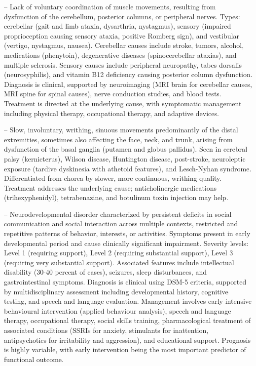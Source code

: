 -- Lack of voluntary coordination of muscle movements, resulting from dysfunction of the cerebellum, posterior columns, or peripheral nerves. Types: cerebellar (gait and limb ataxia, dysarthria, nystagmus), sensory (impaired proprioception causing sensory ataxia, positive Romberg sign), and vestibular (vertigo, nystagmus, nausea). Cerebellar causes include stroke, tumors, alcohol, medications (phenytoin), degenerative diseases (spinocerebellar ataxias), and multiple sclerosis. Sensory causes include peripheral neuropathy, tabes dorsalis (neurosyphilis), and vitamin B12 deficiency causing posterior column dysfunction. Diagnosis is clinical, supported by neuroimaging (MRI brain for cerebellar causes, MRI spine for spinal causes), nerve conduction studies, and blood tests. Treatment is directed at the underlying cause, with symptomatic management including physical therapy, occupational therapy, and adaptive devices.

-- Slow, involuntary, writhing, sinuous movements predominantly of the distal extremities, sometimes also affecting the face, neck, and trunk, arising from dysfunction of the basal ganglia (putamen and globus pallidus). Seen in cerebral palsy (kernicterus), Wilson disease, Huntington disease, post-stroke, neuroleptic exposure (tardive dyskinesia with athetoid features), and Lesch-Nyhan syndrome. Differentiated from chorea by slower, more continuous, writhing quality. Treatment addresses the underlying cause; anticholinergic medications (trihexyphenidyl), tetrabenazine, and botulinum toxin injection may help.

-- Neurodevelopmental disorder characterized by persistent deficits in social communication and social interaction across multiple contexts, restricted and repetitive patterns of behavior, interests, or activities. Symptoms present in early developmental period and cause clinically significant impairment. Severity levels: Level 1 (requiring support), Level 2 (requiring substantial support), Level 3 (requiring very substantial support). Associated features include intellectual disability (30-40 percent of cases), seizures, sleep disturbances, and gastrointestinal symptoms. Diagnosis is clinical using DSM-5 criteria, supported by multidisciplinary assessment including developmental history, cognitive testing, and speech and language evaluation. Management involves early intensive behavioural intervention (applied behaviour analysis), speech and language therapy, occupational therapy, social skills training, pharmacological treatment of associated conditions (SSRIs for anxiety, stimulants for inattention, antipsychotics for irritability and aggression), and educational support. Prognosis is highly variable, with early intervention being the most important predictor of functional outcome.

